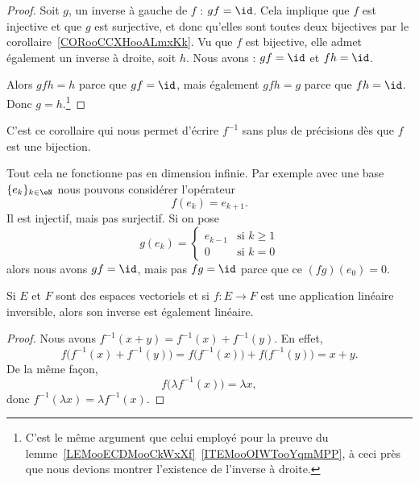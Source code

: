 \begin{proof}
    Soit \( g\), un inverse à gauche de \( f\) : \( gf=\id\). Cela implique que \( f\) est injective et que \( g\) est surjective, et donc qu'elles sont toutes deux bijectives par le corollaire~\ref{CORooCCXHooALmxKk}. Vu que \( f\) est bijective, elle admet également un inverse à droite, soit \( h\). Nous avons : \( gf=\id\) et \( fh=\id\).

    Alors \( gfh=h\) parce que \( gf=\id\), mais également \( gfh=g\) parce que \( fh=\id\). Donc \( g=h\).\footnote{C'est le même argument que celui employé pour la preuve du lemme~\ref{LEMooECDMooCkWxXf}~\ref{ITEMooOIWTooYqmMPP}, à ceci près que nous devions montrer l'existence de l'inverse à droite.}
\end{proof}
C'est ce corollaire qui nous permet d'écrire \( f^{-1}\) sans plus de précisions dès que \( f\) est une bijection.

\begin{example}
    Tout cela ne fonctionne pas en dimension infinie. Par exemple avec une base \( \{ e_k \}_{k\in \eN}\) nous pouvons considérer l'opérateur
    \begin{equation}
        f(e_k)=e_{k+1}.
    \end{equation}
    Il est injectif, mais pas surjectif. Si on pose
    \begin{equation}
        g(e_k)=\begin{cases}
            e_{k-1}    &   \text{si } k\geq 1\\
            0    &    \text{si } k=0
        \end{cases}
    \end{equation}
    alors nous avons \( gf=\id\), mais pas \( fg=\id\) parce que ce \( (fg)(e_0)=0\).
\end{example}

\begin{lemma}       \label{LEMooRZDTooEuLTrO}
    Si \( E\) et \( F\) sont des espaces vectoriels et si \( f\colon E\to F\) est une application linéaire inversible, alors son inverse est également linéaire.
\end{lemma}

\begin{proof}
    Nous avons \( f^{-1}(x+y)=f^{-1}(x)+f^{-1}(y)\). En effet,
    \begin{equation}
        f\big( f^{-1}(x)+f^{-1}(y) \big)=f\big( f^{-1}(x) \big)+f\big( f^{-1}(y) \big)=x+y.
    \end{equation}
    De la même façon,
    \begin{equation}
        f\big( \lambda f^{-1}(x) \big)=\lambda x, 
    \end{equation}
    donc \( f^{-1}(\lambda x)=\lambda f^{-1}(x)\).
\end{proof}

